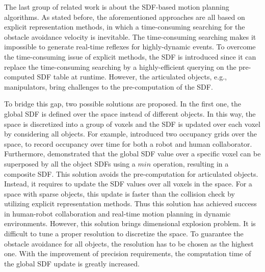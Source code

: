 The last group of related work is about the SDF-based motion planning algorithms. As stated before, the aforementioned approaches are all based on explicit representation methods, in which a time-consuming searching for the obstacle avoidance velocity is inevitable. The time-consuming searching makes it impossible to generate real-time reflexes for highly-dynamic events. To overcome the time-consuming issue of explicit methods, the SDF is introduced since it can replace the time-consuming searching by a highly-efficient querying on the pre-computed SDF table at runtime. However, the articulated objects, e.g., manipulators, bring challenges to the pre-computation of the SDF.

To bridge this gap, two possible solutions are proposed. In the first one, the global SDF is defined over the space instead of different objects. In this way, the space is discretized into a group of voxels and the SDF is updated over each voxel by considering all objects. For example, \cite{2016_ICRA_Considering_avoidance_and_consistency_in_motion_planning} introduced two occupancy grids over the space, to record occupancy over time for both a robot and human collaborator.
Furthermore, \cite{2021_PICAPS_Predicted_composite_signed-distance_fields} demonstrated that the global SDF value over a specific voxel can be superposed by all the object SDFs using a $min$ operation, resulting in a composite SDF.
This solution avoids the pre-computation for articulated objects. Instead, it requires to update the SDF values over all voxels in the space. For a space with sparse objects, this update is faster than the collision check by utilizing explicit representation methods. Thus this solution has achieved success in human-robot collaboration and real-time motion planning in dynamic environments.
However, this solution brings dimensional explosion problem. It is difficult to tune a proper resolution to discretize the space. To guarantee the obstacle avoidance for all objects, the resolution has to be chosen as the highest one. With the improvement of precision requirements, the computation time of the global SDF update is greatly increased.

